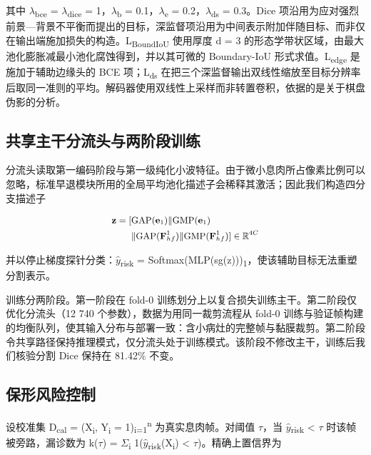 \documentclass[conference]{IEEEtran}
\begin{document}
其中 $\lambda$\textsubscript{bce} = $\lambda$\textsubscript{dice} = 1，$\lambda$\textsubscript{b} = 0.1，$\lambda$\textsubscript{e} = 0.2，$\lambda$\textsubscript{ds} = 0.3。Dice 项沿用为应对强烈前景—背景不平衡而提出的目标\cite{milletari2016vnet}，深监督项沿用为中间表示附加伴随目标、而非仅在输出端施加损失的构造\cite{lee2015dsn}。L\textsubscript{BoundIoU} 使用厚度 d = 3 的形态学带状区域，由最大池化膨胀减最小池化腐蚀得到\cite{eljurdi2021perimeter,karimi2019hd}，并以其可微的 Boundary-IoU 形式求值\cite{cheng2021boundaryiou}。L\textsubscript{edge} 是施加于辅助边缘头的 BCE 项；L\textsubscript{ds} 在把三个深监督输出双线性缩放至目标分辨率后取同一准则的平均。解码器使用双线性上采样而非转置卷积，依据的是关于棋盘伪影的分析\cite{odena2016checker}。

\subsection{共享主干分流头与两阶段训练}

分流头读取第一编码阶段与第一级纯化小波特征。由于微小息肉所占像素比例可以忽略，标准早退模块所用的全局平均池化描述子会稀释其激活\cite{demir2024earlyexit}；因此我们构造四分支描述子

\begin{equation}
\small
\begin{aligned}\mathbf{z}=[&\mathrm{GAP}(\mathbf{e}_1)\|\mathrm{GMP}(\mathbf{e}_1)\\&\|\mathrm{GAP}(\mathbf{F}_{hf}^{1})\|\mathrm{GMP}(\mathbf{F}_{hf}^{1})]\in\mathbb{R}^{4C}\end{aligned}
\end{equation}

并以停止梯度探针分类：$\hat{y}$\textsubscript{risk} = Softmax(MLP(sg(z)))\textsubscript{1}，使该辅助目标无法重塑分割表示。

训练分两阶段。第一阶段在 fold-0 训练划分上以复合损失训练主干。第二阶段仅优化分流头（12 740 个参数），数据为用同一裁剪流程从 fold-0 训练与验证帧构建的均衡队列，使其输入分布与部署一致：含小病灶的完整帧与黏膜裁剪。第二阶段令共享路径保持推理模式，仅分流头处于训练模式。该阶段不修改主干，训练后我们核验分割 Dice 保持在 81.42\% 不变。

\subsection{保形风险控制}

设校准集 D\textsubscript{cal} = {(X\textsubscript{i}, Y\textsubscript{i} = 1)}\textsubscript{i=1}\textsuperscript{n} 为真实息肉帧。对阈值 $\tau$，当 $\hat{y}$\textsubscript{risk} < $\tau$ 时该帧被旁路，漏诊数为 k($\tau$) = $\Sigma$\textsubscript{i} 1($\hat{y}$\textsubscript{risk}(X\textsubscript{i}) < $\tau$)。精确上置信界为
\end{document}
